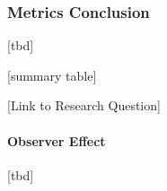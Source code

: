











\subsubsection{Metrics Conclusion}


[tbd]


[summary table]



[Link to Research Question]


\paragraph{Observer Effect}

[tbd]



